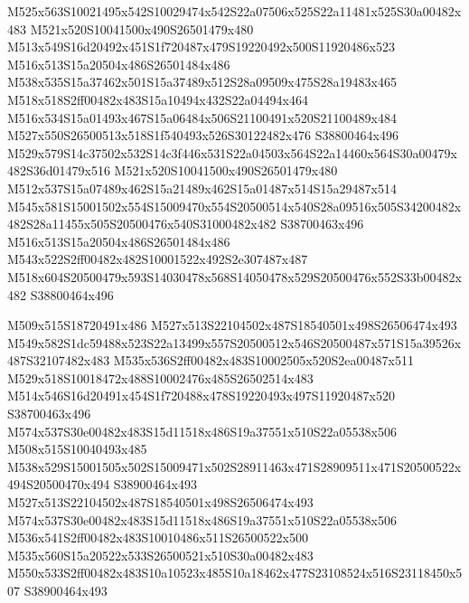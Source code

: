 \documentclass{article}
\begin{document}
\begin{multicols}{2}
M525x563S10021495x542S10029474x542S22a07506x525S22a11481x525S30a00482x483 M521x520S10041500x490S26501479x480 M513x549S16d20492x451S1f720487x479S19220492x500S11920486x523 M516x513S15a20504x486S26501484x486 M538x535S15a37462x501S15a37489x512S28a09509x475S28a19483x465 M518x518S2ff00482x483S15a10494x432S22a04494x464 M516x534S15a01493x467S15a06484x506S21100491x520S21100489x484 M527x550S26500513x518S1f540493x526S30122482x476 S38800464x496 M529x579S14c37502x532S14c3f446x531S22a04503x564S22a14460x564S30a00479x482S36d01479x516 M521x520S10041500x490S26501479x480 M512x537S15a07489x462S15a21489x462S15a01487x514S15a29487x514 M545x581S15001502x554S15009470x554S20500514x540S28a09516x505S34200482x482S28a11455x505S20500476x540S31000482x482 S38700463x496 M516x513S15a20504x486S26501484x486 M543x522S2ff00482x482S10001522x492S2e307487x487 M518x604S20500479x593S14030478x568S14050478x529S20500476x552S33b00482x482 S38800464x496

M509x515S18720491x486 M527x513S22104502x487S18540501x498S26506474x493 M549x582S1dc59488x523S22a13499x557S20500512x546S20500487x571S15a39526x487S32107482x483 M535x536S2ff00482x483S10002505x520S2ea00487x511 M529x518S10018472x488S10002476x485S26502514x483 M514x546S16d20491x454S1f720488x478S19220493x497S11920487x520 S38700463x496 M574x537S30e00482x483S15d11518x486S19a37551x510S22a05538x506 M508x515S10040493x485 M538x529S15001505x502S15009471x502S28911463x471S28909511x471S20500522x494S20500470x494 S38900464x493 M527x513S22104502x487S18540501x498S26506474x493 M574x537S30e00482x483S15d11518x486S19a37551x510S22a05538x506 M536x541S2ff00482x483S10010486x511S26500522x500 M535x560S15a20522x533S26500521x510S30a00482x483 M550x533S2ff00482x483S10a10523x485S10a18462x477S23108524x516S23118450x507 S38900464x493


\end{multicols}
\end{document}
